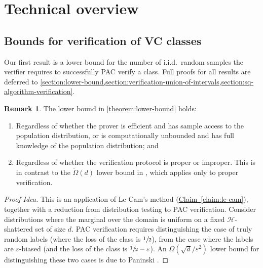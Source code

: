 \documentclass[11pt]{article}
\numberwithin{equation}{section}
\newtheorem{theorem}{Theorem}[section]
\theoremstyle{definition}
\newtheorem{remark}[theorem]{Remark}
\theoremstyle{plain}
\newcommand{\expref}[2]{\hyperref[#2]{#1~\ref{#2}}}
\theoremstyle{definition}\newtheorem{notation}[theorem]{Notation}\theoremstyle{plain}\raggedbottom
\newcommand{\roundBrackets}[1]{
	\mathopen{}\left(#1\right)\mathclose{}
}
\newcommand{\customFunctionRound}[2]{
	#1\roundBrackets{#2}
}
\newcommand{\sfFunction}[2]{
	\customFunctionRound{\mathsf{#1}}{#2}
}
\newcommand{\OmegaOf}[1]{\Omega\roundBrackets{#1}}
\newcommand{\tildeOmegaOf}[1]{\widetilde{\Omega}\roundBrackets{#1}}
\newcommand{\distribution}[1]{\Delta\roundBrackets{#1}}
\newcommand{\VC}[1]{\sfFunction{VC}{#1}}
\newcommand{\bbD}{\mathbb{D}}
\newcommand{\bbN}{\mathbb{N}}
\newcommand{\cH}{\mathcal{H}}
\newcommand{\cX}{\mathcal{X}}
\newcommand{\1}{\mathds{1}}
\newcommand{\mV}{m_{\scriptscriptstyle V}}
\begin{document}
\section{Technical overview}\label{section:technical-overview}

\subsection{Bounds for verification of VC classes}

Our first result is a lower bound for the number of i.i.d.\ random samples the verifier requires to successfully PAC verify a class. Full proofs for all results are deferred to \cref{section:lower-bound,section:verification-union-of-intervals,section:sq-algorithm-verification}.


\begin{remark}
	The lower bound in \cref{theorem:lower-bound} holds:
	\begin{enumerate}
		\item{
			Regardless of whether the prover is efficient and has sample access to the population distribution, or is computationally unbounded and has full knowledge of the population distribution; and
		}
		\item{
			Regardless of whether the verification protocol is proper or improper. This is in contrast to the $\tildeOmegaOf{d}$ lower bound in %
			\cite[Lemma 4.1]{GoldwasserRSY21}, %
			which applies only to proper verification.
		}
	\end{enumerate}
\end{remark}

\begin{proof}[Proof Idea]
	This is an application of Le Cam's method (\expref{Claim}{claim:le-cam}), together with a reduction from distribution testing to PAC verification.  
	Consider distributions where the marginal over the domain is uniform on a fixed $\cH$-shattered set of size $d$.
	PAC verification requires distinguishing the case of truly random labels (where the loss of the class is $\sfrac{1}{2}$), from the case where the labels are $\varepsilon$-biased (and the loss of the class is $\sfrac{1}{2}-\varepsilon$). An $\OmegaOf{\sqrt{d}/\varepsilon^2}$ lower bound for distinguishing these two cases is due to Paninski \cite{DBLP:journals/tit/Paninski08}.
\end{proof}
\end{document}

